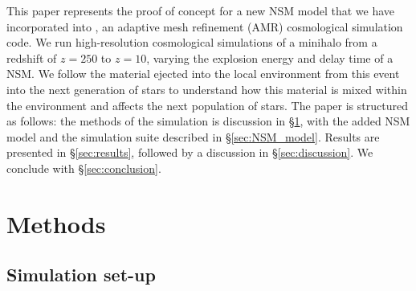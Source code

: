 \documentclass[fleqn,usenatbib]{mnras}
\begin{document}
This paper represents the proof of concept for a new NSM model that we have incorporated into \enzo{}, an adaptive mesh refinement (AMR) cosmological simulation code. We run high-resolution cosmological simulations of a minihalo from a redshift of $z = 250$ to $z = 10$, varying the explosion energy and delay time of a NSM. We follow the material ejected into the local environment from this event into the next generation of stars to understand how this material is mixed within the environment and affects the next population of stars. The paper is structured as follows: the methods of the simulation is discussion in \S \ref{sec:methods}, with the added NSM model and the simulation suite described in \S \ref{sec:NSM_model}. Results are presented in \S \ref{sec:results}, followed by a discussion in \S \ref{sec:discussion}. We conclude with \S \ref{sec:conclusion}.

\section{Methods} \label{sec:methods}

\subsection{Simulation set-up} \label{sec:NSM_simulation}
\end{document}
